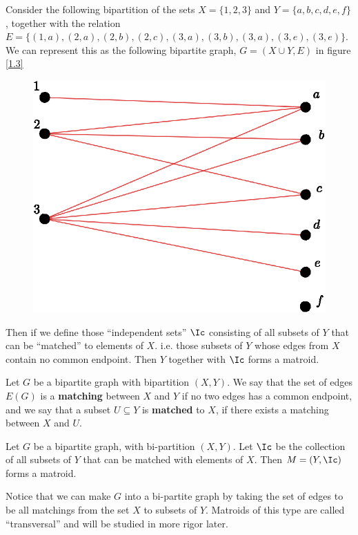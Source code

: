\begin{example}\label{}
    Consider the following bipartition of the sets $X=\{1,2,3\}$ and
    $Y=\{a,b,c,d,e,f\}$, together with the relation $E=\{(1,a), (2,a), (2,b),
        (2,c), (3,a), (3,b), (3,a), (3,e), (3,e)\}$. We can represent this as
        the following bipartite graph, $G=(X \cup Y, E)$ in figure \ref{1.3}
    \begin{figure}[h]
        \centering
        \includegraphics[scale=0.5]{Figures/Chapter1/matching.eps}
        \caption{}
        \label{fig_1.3}
    \end{figure}
    Then if we define those ``independent sets'' $\Ic$ consisting of all subsets
    of  $Y$ that can be ``matched'' to elements of $X$. i.e. those subsets of
    $Y$ whose edges from $X$ contain no common endpoint. Then $Y$ together with
    $\Ic$ forms a matroid.
\end{example}

\begin{definition}
    Let $G$ be a bipartite graph with bipartition $(X,Y)$. We say that the set
    of edges $E(G)$ is a \textbf{matching} between $X$ and $Y$ if no two edges
    has a common endpoint, and we say that a subset $U \subseteq Y$ is
    \textbf{matched} to $X$, if there exists a matching between $X$ and  $U$.
\end{definition}

\begin{lemma}\label{1.1.6}
    Let $G$ be a bipartite graph, with bi-partition $(X,Y)$. Let $\Ic$ be the
    collection of all subsets of  $Y$ that can be matched with elements of  $X$.
    Then $M=(Y, \Ic)$ forms a matroid.
\end{lemma}
\begin{remark}
    Notice that we can make $G$ into a bi-partite graph by taking the set of
    edges to be all matchings from the set  $X$ to subsets of  $Y$. Matroids of
    this type are called ``transversal'' and will be studied in more rigor later.
\end{remark}

